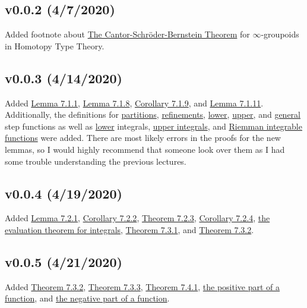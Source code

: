 \documentclass[11pt]{book}
\newcounter{theorem}
\newcounter{lemma}
\newcounter{definition}
\begin{document}
	\subsection{v0.0.2 (4/7/2020)}
		Added footnote about \hyperref[subsec:CBST]{The Cantor-Schr{\"o}der-Bernstein Theorem} for $\infty$-groupoids in Homotopy Type Theory.
	\subsection{v0.0.3 (4/14/2020)}
		Added \hyperref[subsec:lemm711]{Lemma 7.1.1}, \hyperref[subsec:lemm718]{Lemma 7.1.8}, \hyperref[subsec:cor719]{Corollary 7.1.9}, and \hyperref[subsec:lemm7111]{Lemma 7.1.11}.
		Additionally, the definitions for \hyperref[subsec:partition]{partitions}, \hyperref[subsec:refinement]{refinements}, \hyperref[subsec:lowerstepfunction]{lower}, 
		\hyperref[subsec:upperstepfunction]{upper}, and \hyperref[subsec:stepfunction]{general} step functions as well as \hyperref[subsec:lowerintegral]{lower} integrals, 
		\hyperref[subsec:upperintegral]{upper integrals}, and \hyperref[subsec:riemannintegrable]{Riemman integrable functions} were added. There are most likely errors in the proofs for the
		new lemmas, so I would highly recommend that someone look over them as I had some trouble understanding the previous lectures.

	\subsection{v0.0.4 (4/19/2020)}
		Added \hyperref[subsec:lemm721]{Lemma 7.2.1}, \hyperref[subsec:cor722]{Corollary 7.2.2}, \hyperref[subsec:theor723]{Theorem 7.2.3}, \hyperref[subsec:cor724]{Corollary 7.2.4}, 
		\hyperref[subsec:theor725]{the evaluation theorem for integrals}, \hyperref[subsec:theor731]{Theorem 7.3.1}, and \hyperref[subsec:theor732]{Theorem 7.3.2}.

	\subsection{v0.0.5 (4/21/2020)}
		Added \hyperref[subsec:theor732]{Theorem 7.3.2}, \hyperref[subsec:theor733]{Theorem 7.3.3}, \hyperref[subsec:theor741]{Theorem 7.4.1}, \hyperref[subsec:positivepart]{the positive part of
		a function}, and \hyperref[subsec:negativepart]{the negative part of a function}.
\end{document}
